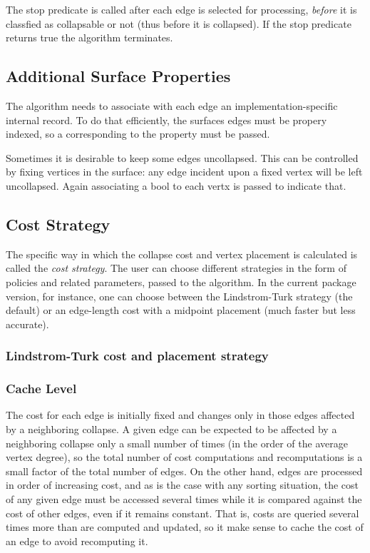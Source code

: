 The stop predicate is called after each edge is selected for processing, {\em before} it is classfied as collapsable or not (thus before it is collapsed). If the stop predicate returns true the algorithm terminates.

\subsection{Additional Surface Properties}

The algorithm needs to associate with each edge an implementation-specific internal record.
To do that efficiently, the surfaces edges must be propery indexed, so
a  
corresponding to the  property must be passed.

Sometimes it is desirable to keep some edges uncollapsed. This can be controlled by fixing vertices in the surface: any edge incident upon a fixed vertex will be left uncollapsed. Again
associating a bool to each vertx is passed to indicate that.

\subsection{Cost Strategy}

The specific way in which the collapse cost and vertex placement is
calculated is called the {\em cost strategy}. The user can choose 
different strategies in the form of policies and related parameters,
passed to the algorithm. In the current package version, for instance,
one can choose between the Lindstrom-Turk strategy 
(the default) or an edge-length cost with a midpoint 
placement (much faster but less accurate).

\subsubsection{Lindstrom-Turk cost and placement strategy\label{SurfaceMeshSimplification:LindstromTurkStrategy}}

\subsubsection{Cache Level}

The cost for each edge is initially fixed and changes only in those edges affected by a neighboring collapse. A given edge can be expected to be affected by a neighboring collapse only a small number of times (in the order of the average vertex degree), so the total number of cost computations and recomputations is a small factor of the total number of edges. On the other hand, edges are processed in order of increasing cost, and as is the case with any sorting situation, the cost of any given edge must be accessed several times while it is compared against the cost of other edges, even if it remains constant. That is, costs are queried several times more than are computed and updated, so it make sense to cache the cost of an edge to avoid recomputing it.

